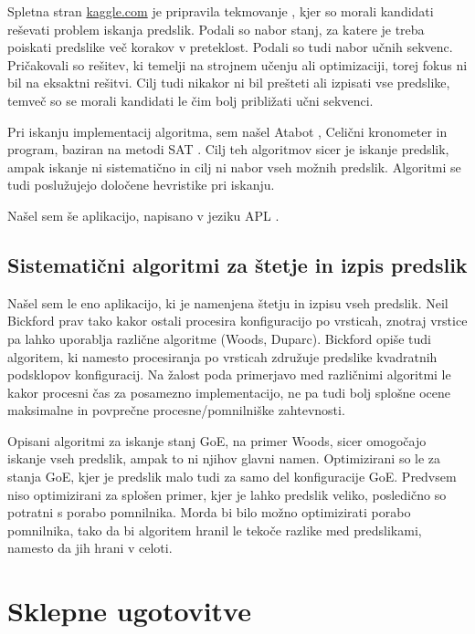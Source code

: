 \documentclass[12pt,a4paper,openany,twoside]{book}
\begin{document}
Spletna stran \url{kaggle.com} je pripravila tekmovanje \cite{kaggle2013},
kjer so morali kandidati reševati problem iskanja predslik.
Podali so nabor stanj, za katere je treba poiskati predslike več korakov v preteklost.
Podali so tudi nabor učnih sekvenc.
Pričakovali so rešitev, ki temelji na strojnem učenju ali optimizaciji,
torej fokus ni bil na eksaktni rešitvi.
Cilj tudi nikakor ni bil prešteti ali izpisati vse predslike,
temveč so se morali kandidati le čim bolj približati učni sekvenci.

Pri iskanju implementacij algoritma, sem našel Atabot \cite{Borah2013},
Celični kronometer \cite{Duxbury2013} in program, baziran na metodi SAT \cite{Pigorsch2015}.
Cilj teh algoritmov sicer je iskanje predslik, ampak iskanje ni sistematično
in cilj ni nabor vseh možnih predslik.
Algoritmi se tudi poslužujejo določene hevristike pri iskanju.

Našel sem še aplikacijo, napisano v jeziku APL \cite{ionreq2013}.

\section{Sistematični algoritmi za štetje in izpis predslik}

Našel sem le eno aplikacijo, ki je namenjena štetju in izpisu vseh predslik.
Neil Bickford \cite{Bickford2012} prav tako kakor ostali procesira konfiguracijo
po vrsticah, znotraj vrstice pa lahko uporablja različne algoritme (Woods, Duparc).
Bickford opiše tudi algoritem, ki namesto procesiranja po vrsticah združuje predslike
kvadratnih podsklopov konfiguracij. Na žalost poda primerjavo med različnimi algoritmi
le kakor procesni čas za posamezno implementacijo, ne pa tudi bolj splošne
ocene maksimalne in povprečne procesne/pomnilniške zahtevnosti.

Opisani algoritmi za iskanje stanj GoE, na primer Woods,
sicer omogočajo iskanje vseh predslik, ampak to ni njihov glavni namen.
Optimizirani so le za stanja GoE, kjer je predslik malo tudi za samo del konfiguracije GoE.
Predvsem niso optimizirani za splošen primer, kjer je lahko predslik veliko,
posledično so potratni s porabo pomnilnika.
Morda bi bilo možno optimizirati porabo pomnilnika,
tako da bi algoritem hranil le tekoče razlike med predslikami, namesto da jih hrani v celoti.




\chapter{Sklepne ugotovitve}
\label{sklep}
\end{document}
